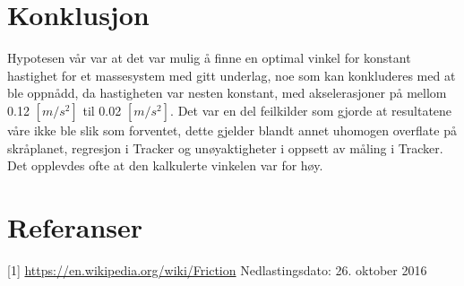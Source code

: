 \documentclass[10pt,a4paper]{report}
\begin{document}
{\let\clearpage\relax\chapter*{Konklusjon}}
Hypotesen vår var at det var mulig å finne en optimal vinkel for konstant hastighet for et massesystem med gitt underlag, noe som kan konkluderes med at ble oppnådd, da hastigheten var nesten konstant, med akselerasjoner på mellom 0.12 $[m/s^2]$ til 0.02 $[m/s^2]$. Det var en del feilkilder som gjorde at resultatene våre ikke ble slik som forventet, dette gjelder blandt annet uhomogen overflate på skråplanet, regresjon i Tracker og unøyaktigheter i oppsett av måling i Tracker. Det opplevdes ofte at den kalkulerte vinkelen var for høy.

\chapter*{Referanser}
[1] \href{url}{https://en.wikipedia.org/wiki/Friction}
Nedlastingsdato: 26. oktober 2016
\end{document}

